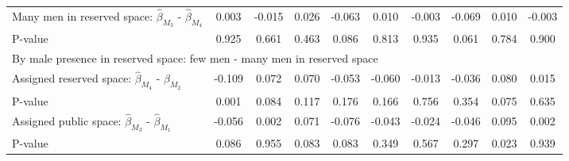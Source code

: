 \begin{tabular}{l*{9}{c}}
\quad Many men in reserved space: $\hat\beta_{M_3}$ - $\hat\beta_{M_4}$&       0.003         &      -0.015         &       0.026         &      -0.063         &       0.010         &      -0.003         &      -0.069         &       0.010         &      -0.003         \\
\quad P-value       &       0.925         &       0.661         &       0.463         &       0.086         &       0.813         &       0.935         &       0.061         &       0.784         &       0.900         \\
\multicolumn{10}{l}{By male presence in reserved space: few men - many men in reserved space} \\ \quad Assigned reserved space: $\hat\beta_{M_4}$ - $\hat\beta_{M_2}$&      -0.109         &       0.072         &       0.070         &      -0.053         &      -0.060         &      -0.013         &      -0.036         &       0.080         &       0.015         \\
\quad P-value       &       0.001         &       0.084         &       0.117         &       0.176         &       0.166         &       0.756         &       0.354         &       0.075         &       0.635         \\
\quad Assigned public space: $\hat\beta_{M_3}$ - $\hat\beta_{M_1}$&      -0.056         &       0.002         &       0.071         &      -0.076         &      -0.043         &      -0.024         &      -0.046         &       0.095         &       0.002         \\
\quad P-value       &       0.086         &       0.955         &       0.083         &       0.083         &       0.349         &       0.567         &       0.297         &       0.023         &       0.939         \\
\hline\hline \end{tabular}

